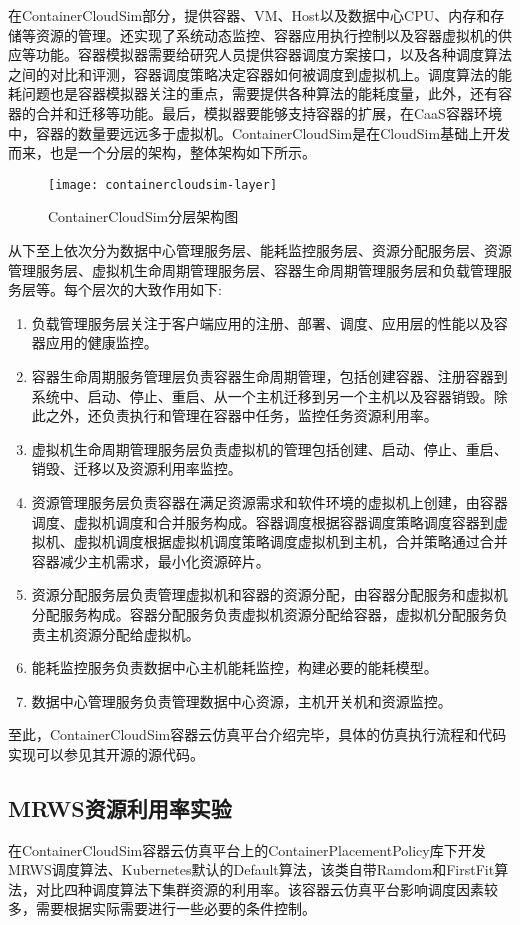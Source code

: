 在ContainerCloudSim部分，提供容器、VM、Host以及数据中心CPU、内存和存储等资源的管理。还实现了系统动态监控、容器应用执行控制以及容器虚拟机的供应等功能。容器模拟器需要给研究人员提供容器调度方案接口，以及各种调度算法之间的对比和评测，容器调度策略决定容器如何被调度到虚拟机上。调度算法的能耗问题也是容器模拟器关注的重点，需要提供各种算法的能耗度量，此外，还有容器的合并和迁移等功能。最后，模拟器要能够支持容器的扩展，在CaaS容器环境中，容器的数量要远远多于虚拟机。ContainerCloudSim是在CloudSim基础上开发而来，也是一个分层的架构，整体架构如下所示。
\begin{figure}[H] %
	\centering
	\texttt{[image: containercloudsim-layer]}
	\caption{ContainerCloudSim分层架构图}
\end{figure}
从下至上依次分为数据中心管理服务层、能耗监控服务层、资源分配服务层、资源管理服务层、虚拟机生命周期管理服务层、容器生命周期管理服务层和负载管理服务层等。每个层次的大致作用如下:
\begin{enumerate}
	\item 负载管理服务层关注于客户端应用的注册、部署、调度、应用层的性能以及容器应用的健康监控。
	\item 容器生命周期服务管理层负责容器生命周期管理，包括创建容器、注册容器到系统中、启动、停止、重启、从一个主机迁移到另一个主机以及容器销毁。除此之外，还负责执行和管理在容器中任务，监控任务资源利用率。
	\item 虚拟机生命周期管理服务层负责虚拟机的管理包括创建、启动、停止、重启、销毁、迁移以及资源利用率监控。
	\item 资源管理服务层负责容器在满足资源需求和软件环境的虚拟机上创建，由容器调度、虚拟机调度和合并服务构成。容器调度根据容器调度策略调度容器到虚拟机、虚拟机调度根据虚拟机调度策略调度虚拟机到主机，合并策略通过合并容器减少主机需求，最小化资源碎片。
	\item 资源分配服务层负责管理虚拟机和容器的资源分配，由容器分配服务和虚拟机分配服务构成。容器分配服务负责虚拟机资源分配给容器，虚拟机分配服务负责主机资源分配给虚拟机。
	\item 能耗监控服务负责数据中心主机能耗监控，构建必要的能耗模型。
	\item 数据中心管理服务负责管理数据中心资源，主机开关机和资源监控。
\end{enumerate}
至此，ContainerCloudSim容器云仿真平台介绍完毕，具体的仿真执行流程和代码实现可以参见其开源的源代码。

\subsection{MRWS资源利用率实验}
在ContainerCloudSim容器云仿真平台上的ContainerPlacementPolicy库下开发MRWS调度算法、Kubernetes默认的Default算法，该类自带Ramdom和FirstFit算法，对比四种调度算法下集群资源的利用率。该容器云仿真平台影响调度因素较多，需要根据实际需要进行一些必要的条件控制。

